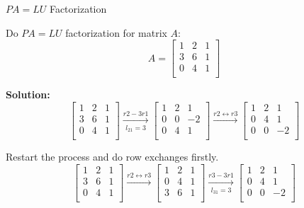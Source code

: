 \documentclass{beamer}
\begin{document}
\begin{frame}{$PA=LU$ Factorization}
\begin{example}
    Do $PA=LU$ factorization for matrix $A$:
    \begin{equation*}
        A=\left[ \begin{matrix}
            1&		2&		1\\
            3&		6&		1\\
            0&		4&		1\\
        \end{matrix} \right]
    \end{equation*}
\end{example}
\textbf{Solution:}
\begin{equation*}
    \left[ \begin{matrix}
        1&		2&		1\\
        3&		6&		1\\
        0&		4&		1\\
    \end{matrix} \right] \xrightarrow[l_{21}=3]{r2-3r1}\left[ \begin{matrix}
        1&		2&		1\\
        0&		0&		-2\\
        0&		4&		1\\
    \end{matrix} \right] \xrightarrow{r2\leftrightarrow r3}\left[ \begin{matrix}
        1&		2&		1\\
        0&		4&		1\\
        0&		0&		-2\\
    \end{matrix} \right]
\end{equation*}

Restart the process and do row exchanges firstly.
\begin{equation*}
    \left[ \begin{matrix}
        1&		2&		1\\
        3&		6&		1\\
        0&		4&		1\\
    \end{matrix} \right] \xrightarrow{r2\leftrightarrow r3}\left[ \begin{matrix}
        1&		2&		1\\
        0&		4&		1\\
        3&		6&		1\\
    \end{matrix} \right] \xrightarrow[l_{31}=3]{r3-3r1}\left[ \begin{matrix}
        1&		2&		1\\
        0&		4&		1\\
        0&		0&		-2\\
    \end{matrix} \right]
\end{equation*}
\end{frame}
\end{document}
